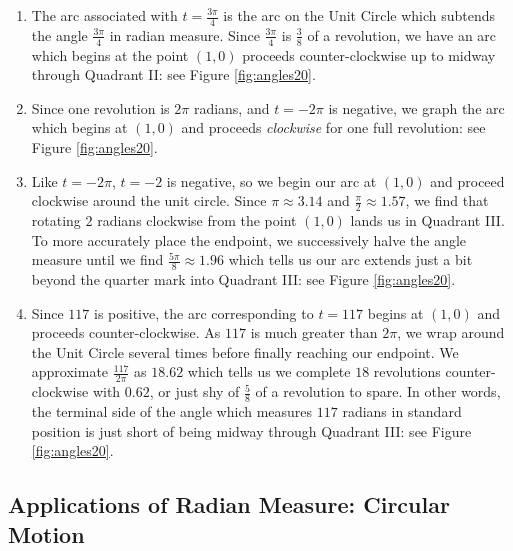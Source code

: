{
\begin{enumerate}

\item  The arc associated with $t = \frac{3 \pi}{4}$ is the arc on the Unit Circle which subtends the angle $\frac{3 \pi}{4}$ in radian measure.  Since $\frac{3 \pi}{4}$ is $\frac{3}{8}$ of a revolution, we have an arc which begins at the point $(1,0)$ proceeds counter-clockwise up to midway through Quadrant II: see Figure \ref{fig:angles20}.  


\item Since one revolution is $2\pi$ radians, and $t=-2\pi$ is negative, we graph  the arc which begins at $(1,0)$ and proceeds \textit{clockwise} for one full revolution: see Figure \ref{fig:angles20}.  


\item Like $t=-2\pi$, $t=-2$ is negative, so we begin our arc at $(1,0)$ and proceed clockwise around the unit circle.  Since $\pi \approx 3.14$ and  $\frac{\pi}{2} \approx 1.57$, we find that rotating $2$ radians clockwise from the point $(1,0)$ lands us in Quadrant III.  To more accurately place the endpoint, we successively halve the angle measure until we find $\frac{5 \pi}{8} \approx 1.96$ which tells us our arc extends just a bit beyond the quarter mark into Quadrant III: see Figure \ref{fig:angles20}.  


\item  Since $117$ is positive, the arc corresponding to $t=117$ begins at $(1,0)$ and proceeds counter-clockwise.  As $117$ is much greater than $2\pi$, we wrap around the Unit Circle several times before finally reaching our endpoint.  We approximate $\frac{117}{2\pi}$ as $18.62$ which tells us we complete $18$ revolutions counter-clockwise with $0.62$, or  just shy of $\frac{5}{8}$ of a revolution to spare.  In other words, the terminal side of the angle which measures $117$ radians in standard position is just short of being midway through Quadrant III: see Figure \ref{fig:angles20}.  

\end{enumerate}
}

\medskip

\subsection{Applications of Radian Measure:  Circular Motion}
\label{circularmotion}

